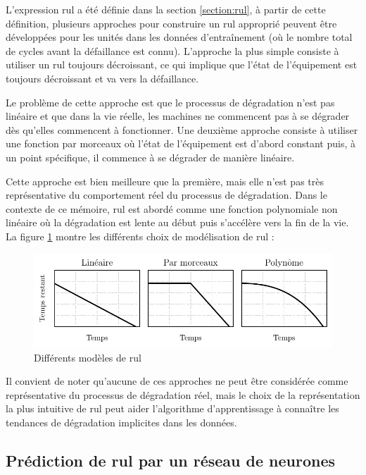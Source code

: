 L'expression \acrshort{rul} a été définie dans la section \ref{section:rul}, à partir de cette définition, plusieurs approches pour construire un \acrshort{rul} approprié peuvent être développées pour les unités dans les données d'entraînement (où le nombre total de cycles avant la défaillance est connu). L'approche la plus simple consiste à utiliser un \acrshort{rul} toujours décroissant, ce qui implique que l'état de l'équipement est toujours décroissant et va vers la défaillance.

Le problème de cette approche est que le processus de dégradation n'est pas linéaire et que dans la vie réelle, les machines ne commencent pas à se dégrader dès qu'elles commencent à fonctionner. Une deuxième approche consiste à utiliser une fonction par morceaux où l'état de l'équipement est d'abord constant puis, à un point spécifique, il commence à se dégrader de manière linéaire.

Cette approche est bien meilleure que la première, mais elle n'est pas très représentative du comportement réel du processus de dégradation. Dans le contexte de ce mémoire, \acrshort{rul} est abordé comme une fonction polynomiale non linéaire où la dégradation est lente au début puis s'accélère vers la fin de la vie. La figure \ref{fig:rul-models} montre les différents choix de modélisation de \acrshort{rul} :

\begin{figure}[H]
    \centering
    \includegraphics{figures/rul_models_fr.pdf}
    \caption{Différents modèles de \acrshort{rul}}
    \label{fig:rul-models}
\end{figure}

Il convient de noter qu'aucune de ces approches ne peut être considérée comme représentative du processus de dégradation réel, mais le choix de la représentation la plus intuitive de \acrshort{rul} peut aider l'algorithme d'apprentissage à connaître les tendances de dégradation implicites dans les données.

\subsection{Prédiction de \acrshort{rul} par un réseau de neurones}

